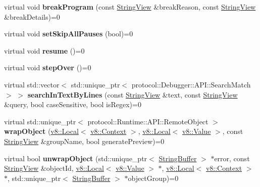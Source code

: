 \begin{DoxyCompactItemize}
virtual void {\bfseries break\+Program} (const \mbox{\hyperlink{classv8__inspector_1_1StringView}{String\+View}} \&break\+Reason, const \mbox{\hyperlink{classv8__inspector_1_1StringView}{String\+View}} \&break\+Details)=0
\item 
\mbox{\label{classv8__inspector_1_1V8InspectorSession_ae98e6ad6dd45492ce828737f7176b501}} 
virtual void {\bfseries set\+Skip\+All\+Pauses} (bool)=0
\item 
\mbox{\label{classv8__inspector_1_1V8InspectorSession_ace573efed7184ee701f06cb2543d4e15}} 
virtual void {\bfseries resume} ()=0
\item 
\mbox{\label{classv8__inspector_1_1V8InspectorSession_aa419715baf430ebac1673160251715db}} 
virtual void {\bfseries step\+Over} ()=0
\item 
\mbox{\label{classv8__inspector_1_1V8InspectorSession_acaa137f90ce833744a2a16bda60490c5}} 
virtual std\+::vector$<$ std\+::unique\+\_\+ptr$<$ protocol\+::\+Debugger\+::\+A\+P\+I\+::\+Search\+Match $>$ $>$ {\bfseries search\+In\+Text\+By\+Lines} (const \mbox{\hyperlink{classv8__inspector_1_1StringView}{String\+View}} \&text, const \mbox{\hyperlink{classv8__inspector_1_1StringView}{String\+View}} \&query, bool case\+Sensitive, bool is\+Regex)=0
\item 
\mbox{\label{classv8__inspector_1_1V8InspectorSession_a7568a840a4c681cbca9ec7ad50aba0e6}} 
virtual std\+::unique\+\_\+ptr$<$ protocol\+::\+Runtime\+::\+A\+P\+I\+::\+Remote\+Object $>$ {\bfseries wrap\+Object} (\mbox{\hyperlink{classv8_1_1Local}{v8\+::\+Local}}$<$ \mbox{\hyperlink{classv8_1_1Context}{v8\+::\+Context}} $>$, \mbox{\hyperlink{classv8_1_1Local}{v8\+::\+Local}}$<$ \mbox{\hyperlink{classv8_1_1Value}{v8\+::\+Value}} $>$, const \mbox{\hyperlink{classv8__inspector_1_1StringView}{String\+View}} \&group\+Name, bool generate\+Preview)=0
\item 
\mbox{\label{classv8__inspector_1_1V8InspectorSession_adbe69bb66c76882db82482db3712b554}} 
virtual bool {\bfseries unwrap\+Object} (std\+::unique\+\_\+ptr$<$ \mbox{\hyperlink{classv8__inspector_1_1StringBuffer}{String\+Buffer}} $>$ $\ast$error, const \mbox{\hyperlink{classv8__inspector_1_1StringView}{String\+View}} \&object\+Id, \mbox{\hyperlink{classv8_1_1Local}{v8\+::\+Local}}$<$ \mbox{\hyperlink{classv8_1_1Value}{v8\+::\+Value}} $>$ $\ast$, \mbox{\hyperlink{classv8_1_1Local}{v8\+::\+Local}}$<$ \mbox{\hyperlink{classv8_1_1Context}{v8\+::\+Context}} $>$ $\ast$, std\+::unique\+\_\+ptr$<$ \mbox{\hyperlink{classv8__inspector_1_1StringBuffer}{String\+Buffer}} $>$ $\ast$object\+Group)=0

\end{DoxyCompactItemize}
